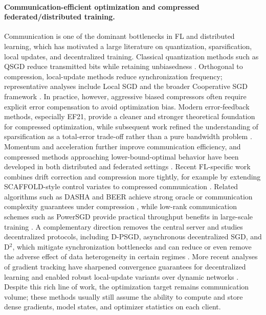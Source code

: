 \paragraph{Communication-efficient optimization and compressed federated/distributed training.}
Communication is one of the dominant bottlenecks in FL and distributed learning, which has motivated a large literature on quantization, sparsification, local updates, and decentralized training. Classical quantization methods such as QSGD reduce transmitted bits while retaining unbiasedness \cite{alistarh2016qsgd}. Orthogonal to compression, local-update methods reduce synchronization frequency; representative analyses include Local SGD and the broader Cooperative SGD framework \cite{lin2018localsgd,wang2018cooperative}. In practice, however, aggressive biased compressors often require explicit error compensation to avoid optimization bias. Modern error-feedback methods, especially EF21, provide a cleaner and stronger theoretical foundation for compressed optimization, while subsequent work refined the understanding of sparsification as a total-error trade-off rather than a pure bandwidth problem \cite{richtarik2021ef21,sahu2021rethinking}. Momentum and acceleration further improve communication efficiency, and compressed methods approaching lower-bound-optimal behavior have been developed in both distributed and federated settings \cite{li2020accelerationcompressed,huang2022lowerbounds}. Recent FL-specific work combines drift correction and compression more tightly, for example by extending SCAFFOLD-style control variates to compressed communication \cite{huang2023stochastic}. Related algorithms such as DASHA and BEER achieve strong oracle or communication complexity guarantees under compression \cite{tyurin2022dasha,zhao2022beer}, while low-rank communication schemes such as PowerSGD provide practical throughput benefits in large-scale training \cite{vogels2019powersgd}. A complementary direction removes the central server and studies decentralized protocols, including D-PSGD, asynchronous decentralized SGD, and D$^2$, which mitigate synchronization bottlenecks and can reduce or even remove the adverse effect of data heterogeneity in certain regimes \cite{lian2017dpsgd,lian2017async,tang2018d2}. More recent analyses of gradient tracking have sharpened convergence guarantees for decentralized learning and enabled robust local-update variants over dynamic networks \cite{koloskova2022improved,ghiasvand2024robust}. Despite this rich line of work, the optimization target remains communication volume; these methods usually still assume the ability to compute and store dense gradients, model states, and optimizer statistics on each client.

